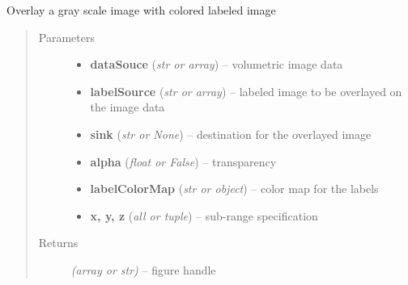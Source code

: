 \documentclass[letterpaper,10pt,english]{sphinxmanual}
\begin{document}
\begin{fulllineitems}
\label{api/ClearMap.Visualization:ClearMap.Visualization.Plot.overlayLabel}
Overlay a gray scale image with colored labeled image
\begin{quote}\begin{description}
\item[{Parameters}] \leavevmode\begin{itemize}
\item {} 
\textbf{dataSouce} (\emph{str or array}) --
volumetric image data

\item {} 
\textbf{labelSource} (\emph{str or array}) --
labeled image to be overlayed on the image data

\item {} 
\textbf{sink} (\emph{str or None}) --
destination for the overlayed image

\item {} 
\textbf{alpha} (\emph{float or False}) --
transparency

\item {} 
\textbf{labelColorMap} (\emph{str or object}) --
color map for the labels

\item {} 
\textbf{x, y, z} (\emph{all or tuple}) --
sub-range specification

\end{itemize}

\item[{Returns}] \leavevmode
\emph{(array or str)} --
figure handle

\end{description}\end{quote}




{\hyperref[api/ClearMap.Visualization:ClearMap.Visualization.Plot.overlayPoints]{\emph{}}}



\end{fulllineitems}

\end{document}
